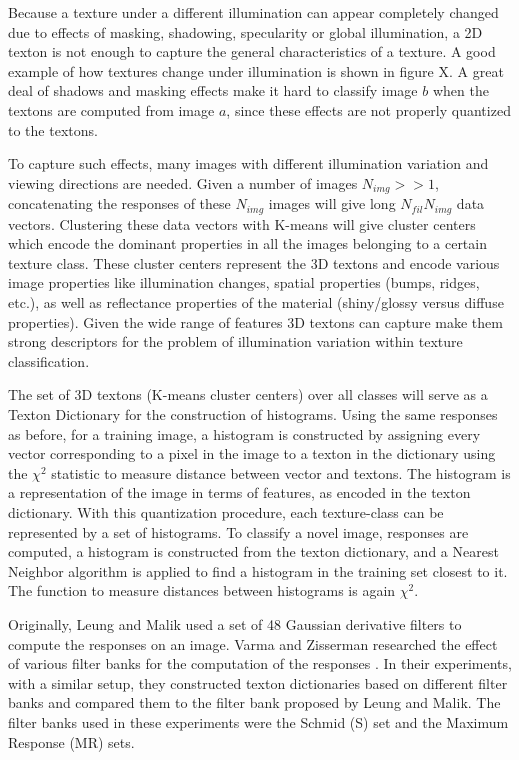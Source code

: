 Because a texture under a different illumination can appear completely changed due to effects of masking, shadowing, specularity or global illumination, a 2D texton is not enough to capture the general characteristics of a texture. A good example of how textures change under illumination is shown in figure X. A great deal of shadows and masking effects make it hard to classify image $b$ when the textons are computed from image $a$, since these effects are not properly quantized to the textons. 

To capture such effects, many images with different illumination variation and viewing directions are needed. Given a number of images $N_{img} >> 1$,  concatenating the responses of these $N_{img}$ images will give long $N_{fil}N_{img}$ data vectors. Clustering these data vectors with K-means will give cluster centers which encode the dominant properties in all the images belonging to a certain texture class. These cluster centers represent the 3D textons and encode various image properties like illumination changes, spatial properties (bumps, ridges, etc.), as well as reflectance properties of the material (shiny/glossy versus diffuse properties). Given the wide range of features 3D textons can capture make them strong descriptors for the problem of illumination variation within texture classification.

The set of 3D textons (K-means cluster centers) over all classes will serve as a Texton Dictionary for the construction of histograms. Using the same responses as before, for a training image, a histogram is constructed by assigning every vector corresponding to a pixel in the image to a texton in the dictionary using the $\chi^2$ statistic to measure distance between vector and textons. The histogram is a representation of the image in terms of features, as encoded in the texton dictionary. With this quantization procedure, each texture-class can be represented by a set of histograms. To classify a novel image, responses are computed, a histogram is constructed from the texton dictionary, and a Nearest Neighbor algorithm is applied to find a histogram in the training set closest to it. The function to measure distances between histograms is again $\chi^2$.

Originally, Leung and Malik used a set of 48 Gaussian derivative filters to compute the responses on an image. Varma and Zisserman researched the effect of various filter banks for the computation of the responses \cite{VarmaZisserman}. In their experiments, with a similar setup, they constructed texton dictionaries based on different filter banks and compared them to the filter bank proposed by Leung and Malik. The filter banks used in these experiments were the Schmid (S) set and the Maximum Response (MR) sets. 

